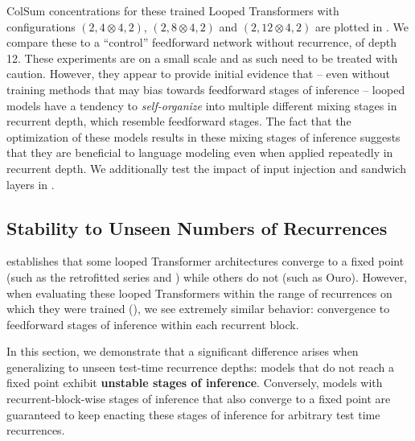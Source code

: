 \documentclass{article}
\theoremstyle{plain}
\theoremstyle{definition}
\theoremstyle{remark}
\begin{document}
ColSum concentrations for these trained Looped Transformers with configurations $(2, 4\otimes 4, 2)$, $(2, 8\otimes 4, 2)$ and $(2, 12\otimes 4, 2)$ are plotted in . We compare these to a ``control'' feedforward network without recurrence, of depth 12. These experiments are on a small scale and as such need to be treated with caution. However, they appear to provide initial evidence that -- even without training methods that may bias towards feedforward stages of inference -- looped models have a tendency to \emph{self-organize} into multiple different mixing stages in recurrent depth, which resemble feedforward stages. The fact that the optimization of these models results in these mixing stages of inference suggests that they are beneficial to language modeling even when applied repeatedly in recurrent depth. We additionally test the impact of input injection and sandwich layers in .



\subsection{Stability to Unseen Numbers of Recurrences}\label{sec:stability}

 establishes that some looped Transformer architectures converge to a fixed point (such as the retrofitted series and \raven{}) while others do not (such as Ouro). However, when evaluating these looped Transformers within the range of recurrences on which they were trained (), we see extremely similar behavior: convergence to feedforward stages of inference within each recurrent block.

In this section, we demonstrate that a significant difference arises when generalizing to unseen test-time recurrence depths: models that do not reach a fixed point exhibit \textbf{unstable stages of inference}. Conversely, models with recurrent-block-wise stages of inference that also converge to a fixed point are guaranteed to keep enacting these stages of inference for arbitrary test time recurrences.
\end{document}
